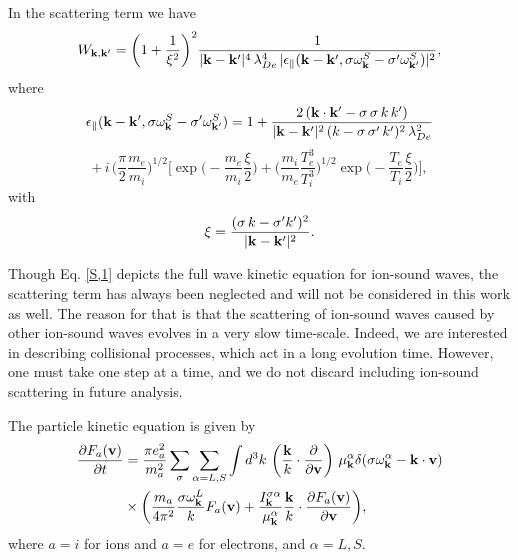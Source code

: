 \documentclass[12pt,a4paper,ruledheader]{report}
\begin{document}
In the scattering term we have
\begin{equation}
  \label{W}
W_{{\bf k},{\bf k}'}=\biggl(1+\frac{1}{\xi^2}\biggr)^2
\frac{1}{|{\bf k}-{\bf k}'|^4\,\lambda_{De}^4\,
|\epsilon_\parallel({\bf k}-{\bf k}',
\sigma\omega_{\bf k}^S-\sigma '\omega_{{\bf k}'}^S)|^2},
\end{equation}
where
\begin{equation}
  \label{eps-par}
\epsilon_\parallel({\bf k}-{\bf k}',
\sigma\omega_{\bf k}^S-\sigma '\omega_{{\bf k}'}^S)
=1+\frac{2\,({\bf k}\cdot{\bf k}'-\sigma\,\sigma\,k\,k')}
{|{\bf k}-{\bf k}'|^2\,(k-\sigma\,\sigma '\,k')^2\,\lambda_{De}^2}
\end{equation}
\begin{displaymath}
+\,i\,\biggl(\frac{\pi}{2}\frac{m_e}{m_i}\biggr)^{1/2}
\biggl[\exp\biggl(-\frac{m_e}{m_i}\frac{\xi}{2}\biggr)
+\biggl(\frac{m_i}{m_e}\frac{T_e^3}{T_i^3}\biggr)^{1/2}
\exp\biggl(-\frac{T_e}{T_i}\frac{\xi}{2}\biggr)\biggr],
\end{displaymath}
with
\begin{equation}
  \label{xi}
\xi=\frac{(\sigma\,k-\sigma ' k')^2}{|{\bf k}-{\bf k}'|^2}.
\end{equation}

Though Eq. \eqref{S,1} depicts the full wave kinetic equation for
ion-sound waves, the scattering term has always been neglected and
will not be considered in this work as well. The reason for that is
that the scattering of ion-sound waves caused by other ion-sound
waves evolves in a very slow time-scale. Indeed, we are interested
in describing collisional processes, which act in a long evolution
time. However, one must take one step at a time, and we do not
discard including ion-sound scattering in future analysis.  





The particle kinetic equation is given by
\begin{equation}
\begin{split}
\frac{\partial F_a({\bf v})}{\partial t}&=\frac{\pi e_a^2}{m_a^2}
\sum_\sigma\sum_{\alpha=L,S}\int d^3k\ \biggl(\frac{\bf k}{k}
\cdot\frac{\partial}{\partial{\bf v}}\biggr)\ \mu_{\bf k}^\alpha
\delta(\sigma\omega_{\bf k}^\alpha-{\bf k}\cdot{\bf v})\\
&\times\biggl(\frac{m_a}{4\pi^2}\frac{\sigma\omega_{\bf k}^L}{k}
F_a({\bf v})+\frac{I_{\bf k}^{\sigma\alpha}}{\mu_{\bf k}^\alpha}
\frac{\bf k}{k}\cdot\frac{\partial F_a({\bf v})}{\partial{\bf v}}\biggr),
\end{split}
\label{Fa,1}
\end{equation}
where $a=i$ for ions and $a=e$ for electrons, and $\alpha=L,S$.
\end{document}
